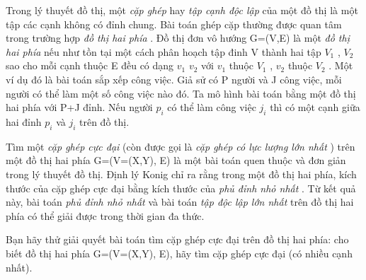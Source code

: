 Trong lý thuyết đồ thị, một   \textit{    cặp ghép   }   hay   \textit{    tập cạnh độc lập   }   của một đồ thị là một tập các cạnh không có đỉnh chung. Bài toán ghép   cặp thường được quan tâm trong trường hợp   \textit{    đồ thị hai phía   }   . Đồ thị đơn vô hướng G=(V,E) là một   \textit{    đồ thị hai phía   }   nếu như tồn tại một   cách phân hoạch tập đinh V thành hai tập $V_{1}$   , $V_{2}$   sao cho mỗi cạnh thuộc E đều có dạng $v_{1}$   $v_{2}$   với $v_{1}$   thuộc $V_{1}$   , $v_{2}$   thuộc $V_{2}$   . Một ví dụ đó là bài toán sắp xếp công việc. Giả sử có P người và   J công việc, mỗi người có thể làm một số công việc nào đó. Ta mô hình bài toán bằng một đồ thị hai phía với P+J đỉnh. Nếu người $p_{i}$   có   thể làm công việc $j_{i}$   thì có một cạnh giữa hai đỉnh $p_{i}$   và $j_{i}$   trên đồ thị.  

   Tìm một   \textit{    cặp ghép cực đại   }   (còn được gọi là   \textit{    cặp ghép có lực lượng lớn nhất   }   ) trên một đồ thị hai phía G=(V=(X,Y), E) là một bài   toán quen thuộc và đơn giản trong lý thuyết đồ thị. Định lý Konig chỉ ra rằng trong một đồ thị hai phía, kích thước của cặp ghép cực đại bằng kích thước   của   \textit{    phủ đỉnh nhỏ nhất   }   . Từ kết quả này, bài toán   \textit{    phủ đỉnh nhỏ nhất   }   và bài toán   \textit{    tập độc lập lớn nhất   }   trên đồ thị hai phía có thể giải   được trong thời gian đa thức.  

   Bạn hãy thử giải quyết bài toán tìm cặp ghép cực đại trên đồ thị hai phía: cho biết đồ thị hai phía G=(V=(X,Y), E), hãy tìm cặp ghép cực đại (có   nhiều cạnh nhất).
